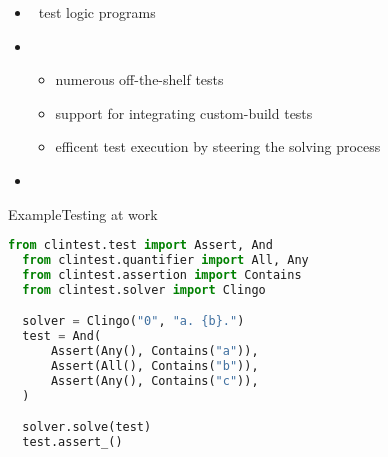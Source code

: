 \begin{frame}{\clintest}
  \begin{itemize}
  \item {} \ test logic programs
  \item {}
    \begin{itemize}
    \item numerous off-the-shelf tests
    \item support for integrating custom-build tests
    \item efficent test execution by steering the solving process
    \end{itemize}
  \item {} \ \clingo
  \end{itemize}
\end{frame}
\begin{frame}[fragile]{Example}{Testing at work}
  \begin{lstlisting}[language=python,basicstyle=\small\ttfamily]
  from clintest.test import Assert, And
  from clintest.quantifier import All, Any
  from clintest.assertion import Contains
  from clintest.solver import Clingo

  solver = Clingo("0", "a. {b}.")
  test = And(
      Assert(Any(), Contains("a")),
      Assert(All(), Contains("b")),
      Assert(Any(), Contains("c")),
  )

  solver.solve(test)
  test.assert_()
  \end{lstlisting}
  \end{frame}
%
